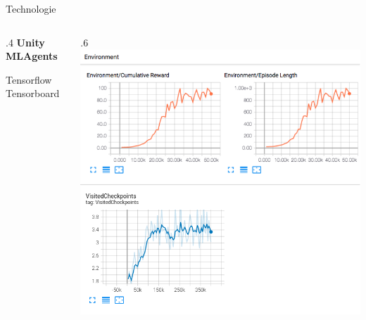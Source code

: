 \begin{frame}{Technologie}

	\begin{columns}

		\begin{column}{.4\hsize}
			\textbf{Unity MLAgents}
			\begin{itemize}
				\myitem Tensorflow
				\myitem Tensorboard
			\end{itemize}
		\end{column}
		
		\begin{column}{.6\hsize}
			\includegraphics[width=\linewidth]{figures/tensorboard.png}
		\end{column}

	\end{columns}

\end{frame}
